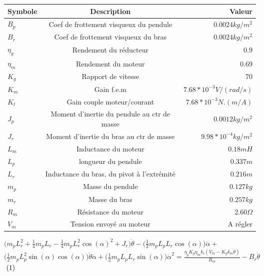 \documentclass[12pt, a4paper, openany]{report}
\begin{document}
\begin{center}
\begin{tabular}{|l|c|r|}
\hline \rowcolor{mauve} Symbole & Description &  Valeur  \\
\hline $B_{p}$  &  Coef de frottement visqueux du pendule  & $0.0024 kg/m^{2}$   \\
\hline $B_{r}$ & Coef de frottement visqueux du bras & $0.0024 kg/m^{2}$ \\
\hline $\eta_{g}$  &  Rendement du réducteur  & $0.9$  \\
\hline $\eta_{m}$  &  Rendement du moteur  & $0.69$  \\
\hline $K_{g}$  &  Rapport de vitesse  & $70$  \\
\hline $K_{m}$  &  Gain f.e.m  & $7.68*10^{-3} V/(rad/s)$ \\
\hline $K_{t}$  &  Gain couple moteur/courant  & $7.68*10^{-3} N.(m/A)$\\
\hline $J_{p}$ &  Moment d'inertie du pendule au ctr de masse & $0.0012 kg/m^{2}$ \\
\hline $J_{r}$  &  Moment d'inertie du bras au ctr de masse  & $9.98*10^{-4} kg/m^{2}$ \\
\hline $L_{m}$  &   Inductance du moteur & $0.18 mH$\\
\hline $L_{p}$  &  longueur du pendule  & $0.337 m$ \\
\hline $L_{r}$  &  Inductance du bras, du pivot à l'extrémité   & $0.216 m$ \\
\hline $m_{p}$  &  Masse du pendule  & $0.127 kg$\\
\hline $m_{r}$  &   Masse du bras  & $0.257 kg$\\
\hline $R_{m}$  &   Résistance du moteur  & $2.60 \Omega$ \\
\hline $V_{m}$  &  Tension envoyé au moteur   &  A régler \\

\hline 
\end{tabular}
\end{center} 


$\bigg(m_{p}L_{r}^{2}+\frac{1}{4}m_{p}L_{r}-\frac{1}{4}m_{p}L_{r}^{2}\cos(\alpha)^{2} +J_{r} \bigg)\ddot{\theta}- \bigg(\frac{1}{2}m_{p}L_{p}L_{r}\cos(\alpha) \bigg)\ddot{\alpha}+$\\ $\bigg(\frac{1}{2}m_{p}L_{p}^{2}\sin(\alpha)\cos(\alpha) \bigg)\dot{\theta}\dot{\alpha} + \bigg(\frac{1}{2}m_{p}L_{p}L_{r}\sin(\alpha) \bigg)\dot{\alpha}^{2}=\frac{\eta_{g}K_{g}\eta_{m}k_{t}(V_{m}- K_{g}k_{m}\dot{\theta})}{R_{m}}-B_{r}\dot{\theta}$ $\hspace{1mm}(1)$ \\ 
\end{document}

